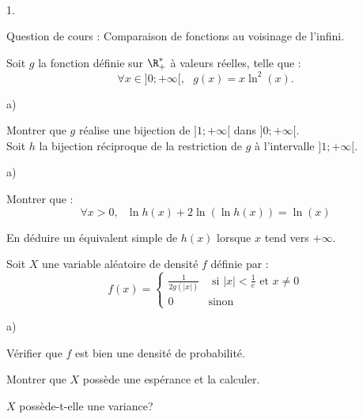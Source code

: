 \documentclass[11pt]{article}%
\begin{document}
\newpage


\begin{exerciceAP}~\\
  \begin{noliste}{1.}
    \setlength{\itemsep}{2mm}
  \item Question de cours : Comparaison de fonctions au voisinage de l'infini.
  \item Soit $g$ la fonction définie sur $\R_+^*$ à valeurs réelles, telle que :
    \[
    \forall x \in ] 0 ; +\infty[,\ \ \ g(x) = x \ln^2 (x).
    \]
    \begin{noliste}{a)}
    \setlength{\itemsep}{2mm} 
    \item Montrer que $g$ réalise une bijection de $] 1 ; +\infty[$
      dans $] 0 ; +\infty[$. \\
      Soit $h$ la bijection réciproque de la restriction de $g$ à
      l'intervalle $]1 ; +\infty[$.
    \item
      \begin{noliste}{a)}
    \setlength{\itemsep}{2mm}
      \item Montrer que :
        \[
        \forall x > 0,\ \ \ \ln h(x) + 2 \ln ( \ln h(x) ) = \ln (x)
        \]
      \item En déduire un équivalent simple de $h(x)$ lorsque $x$ tend
        vers $+\infty$.
      \end{noliste}
    \end{noliste}
  \item Soit $X$ une variable aléatoire de densité $f$ définie par :
    \[
    f(x) = \left\{ 
      \begin{array}{ll} 
        \frac{1}{2 g (\vert x \vert)} & \text{ si } \vert x \vert <
        \frac{1}{e} \text{ et } x \neq 0 \\ 
        0 & \text{sinon} 
      \end{array} \right.
    \]
    \begin{noliste}{a)}
    \setlength{\itemsep}{2mm}
    \item Vérifier que $f$ est bien une densité de probabilité.
    \item Montrer que $X$ possède une espérance et la calculer.
    \item $X$ possède-t-elle une variance? \\
    \end{noliste}
  \end{noliste}
\end{exerciceAP}
\end{document}
